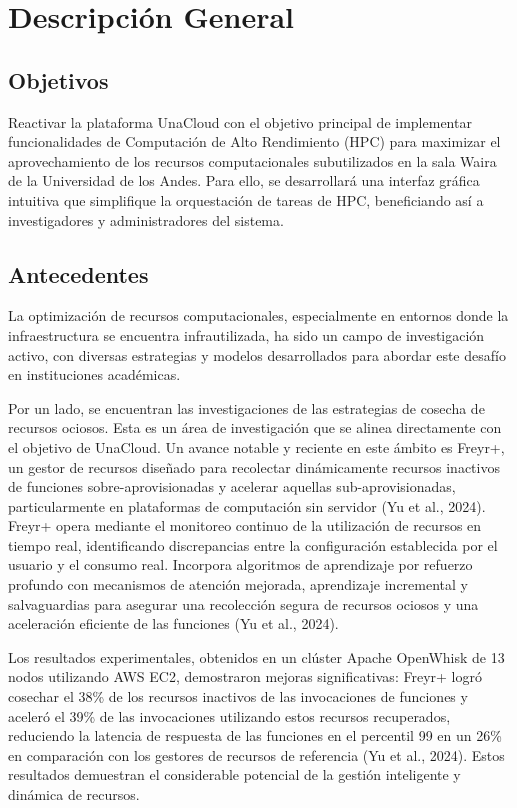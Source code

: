 \section{Descripción General}

\subsection{Objetivos}
Reactivar la plataforma UnaCloud con el objetivo principal de implementar funcionalidades de Computación de Alto Rendimiento (HPC) para maximizar el aprovechamiento de los recursos computacionales subutilizados en la sala Waira de la Universidad de los Andes. Para ello, se desarrollará una interfaz gráfica intuitiva que simplifique la orquestación de tareas de HPC, beneficiando así a investigadores y administradores del sistema.

\subsection{Antecedentes}
La optimización de recursos computacionales, especialmente en entornos donde la infraestructura se encuentra infrautilizada, ha sido un campo de investigación activo, con diversas estrategias y modelos desarrollados para abordar este desafío en instituciones académicas. 

Por un lado, se encuentran las investigaciones de las estrategias de cosecha de recursos ociosos. Esta es un área de investigación que se alinea directamente con el objetivo de UnaCloud. Un avance notable y reciente en este ámbito es Freyr+, un gestor de recursos diseñado para recolectar dinámicamente recursos inactivos de funciones sobre-aprovisionadas y acelerar aquellas sub-aprovisionadas, particularmente en plataformas de computación sin servidor (Yu et al., 2024). Freyr+ opera mediante el monitoreo continuo de la utilización de recursos en tiempo real, identificando discrepancias entre la configuración establecida por el usuario y el consumo real. Incorpora algoritmos de aprendizaje por refuerzo profundo con mecanismos de atención mejorada, aprendizaje incremental y salvaguardias para asegurar una recolección segura de recursos ociosos y una aceleración eficiente de las funciones (Yu et al., 2024).

Los resultados experimentales, obtenidos en un clúster Apache OpenWhisk de 13 nodos utilizando AWS EC2, demostraron mejoras significativas: Freyr+ logró cosechar el 38\% de los recursos inactivos de las invocaciones de funciones y aceleró el 39\% de las invocaciones utilizando estos recursos recuperados, reduciendo la latencia de respuesta de las funciones en el percentil 99 en un 26\% en comparación con los gestores de recursos de referencia (Yu et al., 2024). Estos resultados demuestran el considerable potencial de la gestión inteligente y dinámica de recursos.


